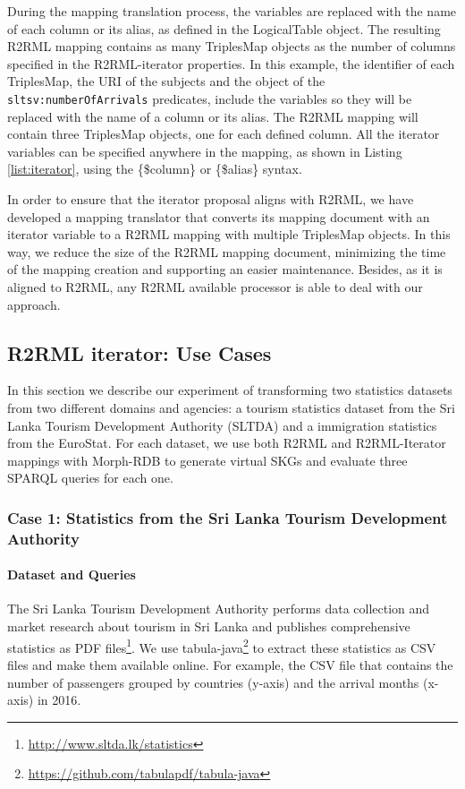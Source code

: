 During the mapping translation process, the variables are replaced with the name of each column or its alias, as defined in the LogicalTable object. The resulting R2RML mapping contains as many TriplesMap objects as the number of columns specified in the R2RML-iterator properties. In this example, the identifier of each TriplesMap, the URI of the subjects and the object of the \texttt{sltsv:numberOfArrivals} predicates, include the variables so they will be replaced with the name of a column or its alias. The R2RML mapping will contain three TriplesMap objects, one for each defined column. All the iterator variables can be specified anywhere in the mapping, as shown in Listing \ref{list:iterator}, using the \{\$column\} or \{\$alias\} syntax.

In order to ensure that the iterator proposal aligns with R2RML, we have developed a mapping translator that converts its mapping document with an iterator variable to a R2RML mapping with multiple TriplesMap objects. In this way, we reduce the size of the R2RML mapping document, minimizing the time of the mapping creation and supporting an easier maintenance. Besides, as it is aligned to R2RML, any R2RML available processor is able to deal with our approach. 

\subsection{R2RML iterator: Use Cases}
In this section we describe our experiment of transforming two statistics datasets from two different domains and agencies: a tourism statistics dataset from the Sri Lanka Tourism Development Authority (SLTDA) and a immigration statistics from the EuroStat. For each dataset, we use both R2RML and R2RML-Iterator mappings with Morph-RDB to generate virtual SKGs and evaluate three SPARQL queries for each one.

\subsubsection{Case 1: Statistics from the Sri Lanka Tourism Development Authority}
\noindent\paragraph{Dataset and Queries}
The Sri Lanka Tourism Development Authority performs data collection and market research about tourism in Sri Lanka and publishes comprehensive statistics as PDF files\footnote{\url{http://www.sltda.lk/statistics}}. We use tabula-java\footnote{\url{https://github.com/tabulapdf/tabula-java}} to extract these statistics as CSV files and make them available online. For example, the CSV file that contains the number of passengers grouped by countries (y-axis) and the arrival months (x-axis) in 2016.

